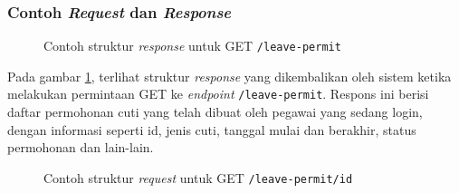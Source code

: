 \subsubsection{Contoh \textit{Request} dan \textit{Response}}
\begin{figure}
    \centering
    \caption{Contoh struktur \textit{response} untuk GET \texttt{/leave-permit}}
    \label{fig:response_leave_permit}
\end{figure}
Pada gambar \ref{fig:response_leave_permit}, terlihat struktur \textit{response} yang dikembalikan oleh sistem ketika melakukan permintaan GET ke \textit{endpoint} \texttt{/leave-permit}. Respons ini berisi daftar permohonan cuti yang telah dibuat oleh pegawai yang sedang login, dengan informasi seperti id, jenis cuti, tanggal mulai dan berakhir, status permohonan dan lain-lain.


\begin{figure}
    \centering
    \caption{Contoh struktur \textit{request} untuk GET \texttt{/leave-permit/{id}}}
    \label{fig:request_leave_permit_by_id_get}
\end{figure}

